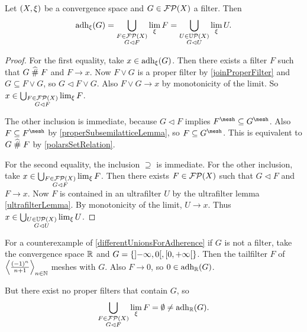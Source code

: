 \begin{proposition} \label{differentUnionsForAdherence}
Let $\left( X,\xi \right)$ be a convergence space and $G\in\operatorname{\mathcal{FP}}(X)$ a filter. Then
\[ \operatorname{adh}_\xi(G) = \displaystyle\bigcup_{\substack{F\in\operatorname{\mathcal{FP}}(X) \\ G\lhd F}}\lim_\xi F = \displaystyle\bigcup_{\substack{U\in\operatorname{\mathbb{U}\mathcal{P}}(X) \\ G\lhd U}}\lim_\xi U. \]
\end{proposition}
\begin{proof}
For the first equality, take $x\in \operatorname{adh}_\xi(G)$. Then there exists a filter $F$ such that $G\mathrel{\widehat{\#}} F$ and $F\to x$.
Now $F\vee G$ is a proper filter by \ref{joinProperFilter} and $G\subseteq F\vee G$, so $G\lhd F\vee G$. Also $F\vee G\to x$ by monotonicity of the limit. So $x\in \bigcup_{\substack{F\in\operatorname{\mathcal{FP}}(X) \\ G\lhd F}}\lim_\xi F$.

The other inclusion is immediate, because $G\lhd F$ implies $F^\mesh \subseteq G^\mesh$. Also $F\subseteq F^\mesh$ by \ref{properSubsemilatticeLemma}, so $F\subseteq G^\mesh$. This is equivalent to $G\mathrel{\widehat{\#}} F$ by \ref{polarsSetRelation}.

For the second equality, the inclusion $\supseteq$ is immediate. For the other inclusion, take $x\in \bigcup_{\substack{F\in\operatorname{\mathcal{FP}}(X) \\ G\lhd F}}\lim_\xi F$. Then there exists $F\in\operatorname{\mathcal{FP}}(X)$ such that $G\lhd F$ and $F\to x$. Now $F$ is contained in an ultrafilter $U$ by the ultrafilter lemma \ref{ultrafilterLemma}. By monotonicity of the limit, $U\to x$. Thus $x\in \bigcup_{\substack{U\in\operatorname{\mathbb{U}\mathcal{P}}(X) \\ G \lhd U}}\lim_\xi U$.
\end{proof}

\begin{example}
For a counterexample of \ref{differentUnionsForAdherence} if $G$ is not a filter, take the convergence space $\mathbb{R}$ and $G = \{\interval[o]{-\infty, 0}, \interval[co]{0,+\infty}\}$. Then the tailfilter $F$ of $\left\langle \frac{(-1)^n}{n+1} \right\rangle_{n\in\mathbb{N}}$ meshes with $G$. Also $F\to 0$, so $0\in \operatorname{adh}_{\mathbb{R}}(G)$.

But there exist no proper filters that contain $G$, so
\[ \bigcup_{\substack{F\in\operatorname{\mathcal{FP}}(X) \\ G\lhd F}}\lim_\xi F = \emptyset \neq \operatorname{adh}_{\mathbb{R}}(G). \]
\end{example}

